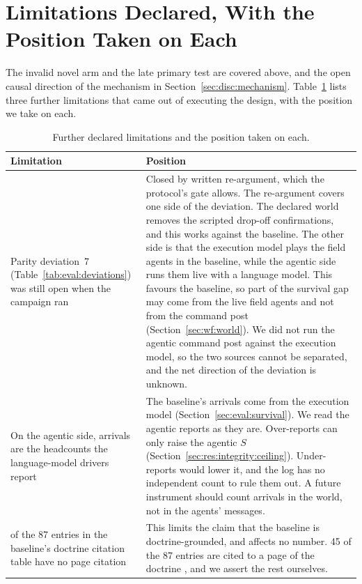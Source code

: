 \section{Limitations Declared, With the Position Taken on Each}
\label{sec:crit:limitations}

The invalid novel arm and the late primary test are covered above, and the
open causal direction of the mechanism in Section~\ref{sec:disc:mechanism}.
Table~\ref{tab:crit:limits} lists three further limitations that came out of
executing the design, with the position we take on each.

\begin{table}[htbp]
\centering
\caption{Further declared limitations and the position taken on each.}
\label{tab:crit:limits}
\small
\begin{tabularx}{\textwidth}{>{\raggedright\arraybackslash}p{4.4cm}>{\raggedright\arraybackslash}X}
\toprule
Limitation & Position \\
\midrule
Parity deviation~7 (Table~\ref{tab:eval:deviations}) was still open when the
campaign ran &
Closed by written re-argument, which the protocol's gate allows. The
re-argument covers one side of the deviation. The declared world removes the
scripted drop-off confirmations, and this works against the baseline. The
other side is that the execution model plays the field agents in the
baseline, while the agentic side runs them live with a language model. This
favours the baseline, so part of the survival gap may come from the live field
agents and not from the command post (Section~\ref{sec:wf:world}). We did not
run the agentic command post against the execution model, so the two sources
cannot be separated, and the net direction of the deviation is unknown. \\
\addlinespace
On the agentic side, arrivals are the headcounts the language-model drivers
report &
The baseline's arrivals come from the execution model
(Section~\ref{sec:eval:survival}). We read the agentic reports as they are.
Over-reports can only raise the agentic $S$
(Section~\ref{sec:res:integrity:ceiling}). Under-reports would lower it, and
the log has no independent count to rule them out. A future instrument should
count arrivals in the world, not in the agents' messages. \\
\addlinespace
42 of the 87 entries in the baseline's doctrine citation table have no page
citation &
This limits the claim that the baseline is doctrine-grounded, and affects no
number. 45 of the 87 entries are cited to a page of the doctrine
\parencite{fwdv100}, and we assert the rest ourselves. \\
\bottomrule
\end{tabularx}
\end{table}

